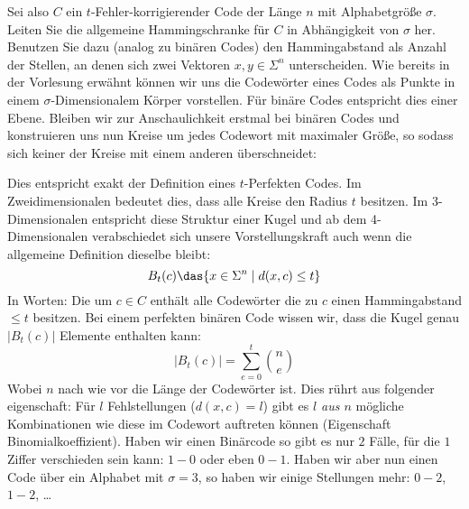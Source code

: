 \begin{aufgabe}
Sei also $C$ ein $t$-Fehler-korrigierender Code der Länge $n$ mit
Alphabetgröße $\sigma$. Leiten Sie die allgemeine Hammingschranke für $C$ in
Abhängigkeit von $\sigma$ her. Benutzen Sie dazu (analog zu binären Codes) den
Hammingabstand als Anzahl der Stellen, an denen sich zwei Vektoren $x,y \in \Sigma^n$ unterscheiden.
\Splitter
Wie bereits in der Vorlesung erwähnt können wir uns die Codewörter eines Codes als Punkte in einem $\sigma$-Dimensionalem Körper vorstellen. Für binäre Codes entspricht dies einer Ebene. Bleiben wir zur Anschaulichkeit erstmal bei binären Codes und konstruieren uns nun Kreise um jedes Codewort mit maximaler Größe, so sodass sich keiner der Kreise mit einem anderen überschneidet:
\begin{wrapfigure}{l}{0.275\textwidth}
    \centering\vspace{-7pt}
\end{wrapfigure}
Dies entspricht exakt der Definition eines \(t\)-Perfekten Codes. Im Zweidimensionalen bedeutet dies, dass alle Kreise den Radius \(t\) besitzen. Im 3-Dimensionalen entspricht diese Struktur einer Kugel und ab dem 4-Dimensionalen verabschiedet sich unsere Vorstellungskraft auch wenn die allgemeine Definition dieselbe bleibt: $$ B_t(c) \das \{x \in \Sigma^n \mid d(x,c) \leq t\}$$
In Worten: Die  um $c \in C$ enthält alle Codewörter die zu $c$ einen Hammingabstand $\leq t$ besitzen. Bei einem perfekten binären Code wissen wir, dass die Kugel genau $|B_t(c)|$ Elemente enthalten kann: $$|B_t(c)| = \sum\limits_{e=0}^t\binom{n}{e}$$
Wobei \(n\) nach wie vor die Länge der Codewörter ist. Dies rührt aus folgender eigenschaft: Für $l$ Fehlstellungen ($d(x,c) = l$) gibt es \emph{$l$ aus $n$} mögliche Kombinationen wie diese im Codewort auftreten können (Eigenschaft Binomialkoeffizient). Haben wir einen Binärcode so gibt es nur $2$ Fälle, für die $1$ Ziffer verschieden sein kann: $1 - 0$ oder eben $0 - 1$. Haben wir aber nun einen Code über ein Alphabet mit $\sigma = 3$, so haben wir einige Stellungen mehr: $0 - 2$, $1 - 2$, \ldots\newline

\end{aufgabe}
